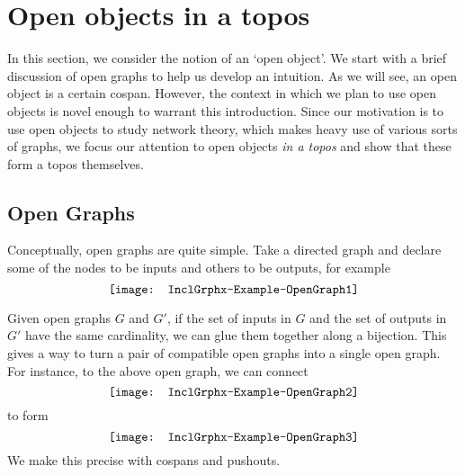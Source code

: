 %
%

 
 

\section{Open objects in a topos} 

In this section, we consider
the notion of an `open object'. 
We start with a brief discussion of open graphs to help us develop an intuition. 
As we will see,
an open object is a certain
cospan. However, the context in which
we plan to use open objects is
novel enough to warrant this introduction.
Since our motivation is to use open objects
to study network theory, which makes
heavy use of various sorts of graphs,
we focus our attention to open objects 
\emph{in a topos} and show that these 
form a topos themselves. 


\subsection*{Open Graphs}

Conceptually, open graphs 
are quite simple.  
Take a directed graph 
and declare some of the nodes 
to be inputs and 
others to be outputs, 
for example
\begin{equation}
\label{ex--OpenGraph1}
\raisebox{-0.5\height}{
\texttt{[image: InclGrphx--Example--OpenGraph1]}
}
\end{equation}

Given open graphs $G$ and $G'$,
if the set of inputs in $G$
and the set of outputs in $G'$
have the same cardinality,
we can glue them together
along a bijection.
This gives a way 
to turn a pair of 
compatible open graphs
into a single open graph.  
For instance, 
to the above open graph, 
we can connect 
\begin{equation}
\label{ex--OpenGraph2}
\raisebox{-0.5\height}{
\texttt{[image: InclGrphx--Example--OpenGraph2]}
}
\end{equation}
to form
\begin{equation}
\label{ex--OpenGraph3}
\raisebox{-0.5\height}{
\texttt{[image: InclGrphx--Example--OpenGraph3]}
}
\end{equation}
We make this precise with
cospans and pushouts.


